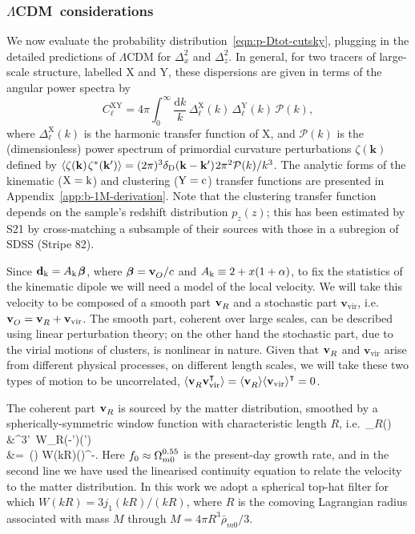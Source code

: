 \documentclass[fleqn,usenatbib]{mnras}
\def\Z#1{_{\lower1pt\hbox{$\scriptstyle#1$}}}
\def\Zu#1{^{\lower-1pt\hbox{$\scriptstyle#1$}}}
\def\ssp{\hspace{0.09em}}
\def\sp{\hspace{0.06em}}
\def\mrm#1{\mathrm{#1}}
\def\rme{\mathrm{e}}
\def\im{\mathrm{i}}
\def\be{\begin{equation}}\def\ee{\end{equation}}
\def\bea#1\eea{\begin{align}#1\end{align}}
\def\LCDM{$\Lambda$CDM}
\def\OmO{\Omega_{m0}}
\def\T{\intercal}
\def\dif{\mathrm{d}}
\def\x{\mathbf{x}}
\def\v{\mathbf{v}}
\def\bk{\mathbf{k}}
\def\kin{{\rm k}}
\def\clu{{\rm c}}
\def\ckin{A_\kin}
\def\dkin{\mathbf{d}_{\kin}}
\def\PR{\mathcal{P}}
\begin{document}
\subsubsection{\LCDM~considerations}\label{sec:predictions}
We now evaluate the probability distribution~\eqref{eqn:p-Dtot-cutsky}, plugging in the detailed
predictions of $\Lambda$CDM for $\Delta_x^2$ and $\Delta_z^2$.
In general, for two tracers of large-scale structure, labelled $\mrm{X}$ and $\mrm{Y}$, these dispersions are given in terms
of the angular power spectra by
\be
    C^{\mrm{XY}}_\ell
        =4\pi\int^\infty_0\frac{\dif k}{k}\,\Delta_\ell^\mrm{X}(k)\,\Delta_\ell^\mrm{Y}(k)\,\PR(k),
    \label{eqn:Cab-ell}
\ee
where $\Delta_\ell^\mrm{X}(k)$ is the harmonic transfer function
of $\mrm{X}$, and $\PR(k)$ is the (dimensionless) power spectrum of primordial curvature
perturbations ${\zeta}(\bk)$ defined by
$\langle{\zeta}(\bk)\ssp{\zeta}^*(\bk')\rangle=(2\pi)^3\delta_{\rm D}(\bk-\bk')\sp 2\pi^2\PR(k)/k^3$.
The analytic forms of the kinematic ($\mrm{X}=\kin$) and clustering ($\mrm{Y}=\clu$) transfer functions are
presented in Appendix~\ref{app:b-1M-derivation}. Note
that the clustering transfer function depends on the
sample's redshift distribution $p_z(z)$; this has been
estimated by S21 by cross-matching a subsample of their sources
with those in a subregion of SDSS (Stripe 82).


Since $\dkin=\ckin\ssp\bm\beta$, where $\bm\beta=\v\Z{O}/c$ and
$\ckin\equiv2+x(1+\alpha)$, to fix the statistics of the kinematic dipole we will need a model of the local velocity.
We will take this velocity to be composed of a smooth
part $\v\Z{R}$ and a stochastic part $\v_\mrm{vir}$, i.e.~$\v\Z{O}=\v\Z{R}+\v_\mrm{vir}$.
The smooth part, coherent over large scales, can be described using linear perturbation theory; on the other hand the
stochastic part, due to the virial motions of clusters, is
nonlinear in nature.
Given that $\v\Z{R}$ and $\v_\mrm{vir}$ arise from different physical
processes, on different length scales,
we will take these two types of motion to be uncorrelated, $\langle\v\Z{R}\v_\mrm{vir}^\T\rangle=\langle\v\Z{R}\rangle\langle\v_\mrm{vir}\rangle\Zu\T=0$.

The coherent part $\v\Z{R}$ is sourced by the
matter distribution,
smoothed by a spherically-symmetric window function with characteristic length $R$, i.e.\
\bea
    \v\Z{R}(\x)
        &\equiv\int\dif^3\x'\ W_R(\x-\x')\ssp \v(\x') \nonumber\\[-2pt]
        &=\int\frac{\dif^3\bk}{(2\pi)^3}\, \frac{-\im\bk}{k}\bigg(\frac{H_0 f_0}{k}\bigg)\ssp
                    W(kR)\sp\delta(\bk)\sp \rme^{-\im\bk\cdot\x}.
\eea
Here $f_0\approx\OmO\Zu{0.55}$ is the present-day growth rate, and
in the second line we have used the linearised continuity equation
to relate the velocity to the matter distribution.
In this work we adopt a spherical top-hat filter for which
$W(kR)=3j_1(kR)/(kR)$, where $R$ is
the comoving Lagrangian radius associated with mass $M$ through
$M=4\pi R^3\bar\rho_{m0}/3$.
\end{document}

